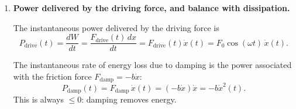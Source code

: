 \documentclass[12pt]{article}
\begin{document}
\begin{enumerate}
Thus, the \emph{cycle-averaged} total mechanical energy is
\begin{equation}
\langle E \rangle
= \langle K \rangle + \langle U \rangle
= \frac{1}{4} k X^2 + \frac{1}{4} m \omega^2 X^2.
\label{eq:avgE_general}
\end{equation}

Using $k = m \omega_0^2$:
\begin{equation}
\langle E \rangle
= \frac{1}{4} m \omega_0^2 X^2 + \frac{1}{4} m \omega^2 X^2
= \frac{m X^2}{4} (\omega_0^2 + \omega^2).
\label{eq:avgE_simplified}
\end{equation}

\textbf{Now evaluate at resonance.}

At \emph{driving frequency equal to the natural frequency}, i.e. $\omega = \omega_0$, the steady-state amplitude becomes
\[
X_\text{res}
= \frac{F_0/m}{\sqrt{(\omega_0^2 - \omega_0^2)^2 + (2\gamma \omega_0)^2}}
= \frac{F_0/m}{2\gamma \omega_0}
= \frac{F_0}{2 m \gamma \omega_0}.
\]

At $\omega = \omega_0$, \eqref{eq:avgE_simplified} gives
\[
\langle E \rangle_{\omega=\omega_0}
= \frac{m X_\text{res}^2}{4} (\omega_0^2 + \omega_0^2)
= \frac{m X_\text{res}^2}{4} (2\omega_0^2)
= \frac{m \omega_0^2 X_\text{res}^2}{2}.
\]

Insert $X_\text{res}$:
\[
\langle E \rangle_{\omega=\omega_0}
= \frac{m \omega_0^2}{2}
\left(\frac{F_0}{2 m \gamma \omega_0}\right)^2
= \frac{m \omega_0^2}{2}
\frac{F_0^2}{4 m^2 \gamma^2 \omega_0^2}
= \frac{F_0^2}{8 m \gamma^2}.
\]

So, at resonance,
\begin{equation}
\boxed{
\langle E \rangle_{\omega=\omega_0}
= \frac{F_0^2}{8 m \gamma^2}
= \frac{F_0^2}{8 m} \left(\frac{2m}{b}\right)^2
= \frac{F_0^2 m}{2 b^2}.
}
\end{equation}

This shows that the average stored mechanical energy at resonance grows as damping becomes smaller (since $\gamma = b/(2m)$).


\item \textbf{Power delivered by the driving force, and balance with dissipation.}

The instantaneous power delivered by the driving force is
\[
P_\text{drive}(t) = \frac{dW}{dt}=\frac{F_\text{drive}(t)\,dx }{dt} = F_\text{drive}(t)\dot{x}(t)
= F_0 \cos(\omega t)\, \dot{x}(t).
\]

The instantaneous rate of energy loss due to damping is the power associated with the friction force $F_\text{damp} = -b \dot{x}$:
\[
P_\text{damp}(t) = F_\text{damp} \, \dot{x}(t)
= (-b \dot{x}) \dot{x}
= - b \dot{x}^2(t).
\]
This is always $\le 0$: damping removes energy.


\end{enumerate}
\end{document}
